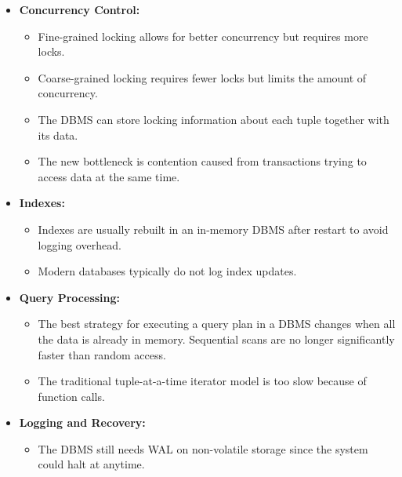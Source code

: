 \documentclass[11pt]{article}
\begin{document}
\begin{itemize}
    \item \textbf{Concurrency Control:}
    \begin{itemize}
        
        \item
        Fine-grained locking allows for better concurrency but requires more locks.
        
        \item
        Coarse-grained locking requires fewer locks but limits the amount of concurrency.
        
        \item
        The DBMS can store locking information about each tuple together with its data.
        
        \item
        The new bottleneck is contention caused from transactions trying to access data at the 
        same time.
    \end{itemize}
    
    \item \textbf{Indexes:}
    \begin{itemize}
        \item
        Indexes are usually rebuilt in an in-memory DBMS after restart to avoid logging overhead.
        
        \item
        Modern databases typically do not log index updates.
    \end{itemize}
    
    \item \textbf{Query Processing:}
    \begin{itemize}
        \item
        The best strategy for executing a query plan in a DBMS changes when all the data is 
        already in memory.
        Sequential scans are no longer significantly faster than random access.
        
        \item
        The traditional tuple-at-a-time iterator model is too slow because of function calls.
    \end{itemize}
    
    \item \textbf{Logging and Recovery:}
    \begin{itemize}
        \item
        The DBMS still needs WAL on non-volatile storage since the system could halt at anytime.
        

\end{itemize}
\end{itemize}
\end{document}
